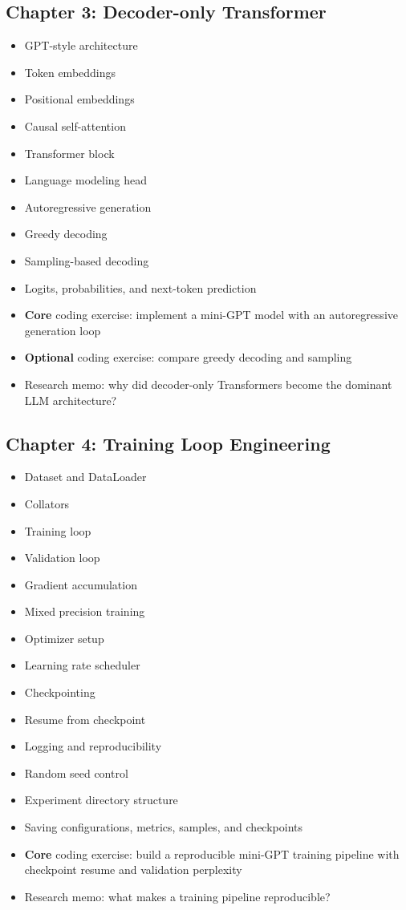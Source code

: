 \documentclass[11pt]{article}
\begin{document}
\subsection{Chapter 3: Decoder-only Transformer}

\begin{itemize}
    \item GPT-style architecture
    \item Token embeddings
    \item Positional embeddings
    \item Causal self-attention
    \item Transformer block
    \item Language modeling head
    \item Autoregressive generation
    \item Greedy decoding
    \item Sampling-based decoding
    \item Logits, probabilities, and next-token prediction
    \item \textbf{Core} coding exercise: implement a mini-GPT model with an autoregressive generation loop
    \item \textbf{Optional} coding exercise: compare greedy decoding and sampling
    \item Research memo: why did decoder-only Transformers become the dominant LLM architecture?
\end{itemize}

\subsection{Chapter 4: Training Loop Engineering}

\begin{itemize}
    \item Dataset and DataLoader
    \item Collators
    \item Training loop
    \item Validation loop
    \item Gradient accumulation
    \item Mixed precision training
    \item Optimizer setup
    \item Learning rate scheduler
    \item Checkpointing
    \item Resume from checkpoint
    \item Logging and reproducibility
    \item Random seed control
    \item Experiment directory structure
    \item Saving configurations, metrics, samples, and checkpoints
    \item \textbf{Core} coding exercise: build a reproducible mini-GPT training pipeline with checkpoint resume and validation perplexity
    \item Research memo: what makes a training pipeline reproducible?
\end{itemize}
\end{document}
